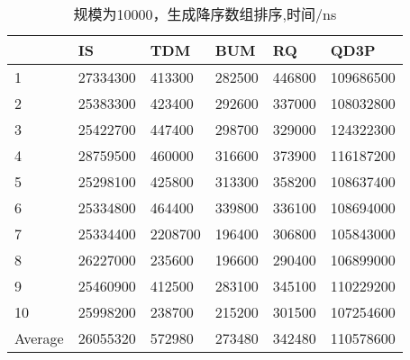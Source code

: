 \documentclass[12pt,a4paper]{ctexart}
\begin{document}
\begin{table}[H]
    \setlength{\abovecaptionskip}{0cm}
    \setlength{\belowcaptionskip}{0.5cm}
    \small
    \centering
    \caption[short]{规模为10000，生成降序数组排序,时间/ns}
    \begin{tabular}{|l|l|l|l|l|l|}
        \hline
                & IS       & TDM     & BUM    & RQ     & QD3P      \\ \hline
        1       & 27334300 & 413300  & 282500 & 446800 & 109686500 \\ \hline
        2       & 25383300 & 423400  & 292600 & 337000 & 108032800 \\ \hline
        3       & 25422700 & 447400  & 298700 & 329000 & 124322300 \\ \hline
        4       & 28759500 & 460000  & 316600 & 373900 & 116187200 \\ \hline
        5       & 25298100 & 425800  & 313300 & 358200 & 108637400 \\ \hline
        6       & 25334800 & 464400  & 339800 & 336100 & 108694000 \\ \hline
        7       & 25334400 & 2208700 & 196400 & 306800 & 105843000 \\ \hline
        8       & 26227000 & 235600  & 196600 & 290400 & 106899000 \\ \hline
        9       & 25460900 & 412500  & 283100 & 345100 & 110229200 \\ \hline
        10      & 25998200 & 238700  & 215200 & 301500 & 107254600 \\ \hline
        Average & 26055320 & 572980  & 273480 & 342480 & 110578600 \\ \hline
    \end{tabular}
\end{table}
\end{document}
